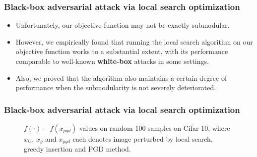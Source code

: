 \documentclass[10pt,mathserif]{beamer}
\begin{document}
\begin{frame}
\frametitle{Black-box adversarial attack via local search optimization}
\begin{itemize}\itemsep=12pt
\item Unfortunately, our objective function may not be exactly submodular.\pause
\item However, we empirically found that running the local search algorithm on our objective function works to a substantial extent, with its performance comparable to well-known \textbf{white-box} attacks in some settings.\pause
\item Also, we proved that the algorithm also maintains a certain degree of performance when the submodularity is not severely deteriorated.
\end{itemize}
\end{frame}

\begin{frame}
    \frametitle{Black-box adversarial attack via local search optimization}
    \begin{figure}
        \centering
        \hspace{2.1em}
        \caption{$f(\cdot)-f(x_{pgd})$ values on random 100 samples on Cifar-10, where $x_{ls}$, $x_{g}$ and $x_{pgd}$ each denotes image perturbed by local search, greedy insertion and PGD method.}
    \end{figure}
    
\end{frame}
\end{document}
